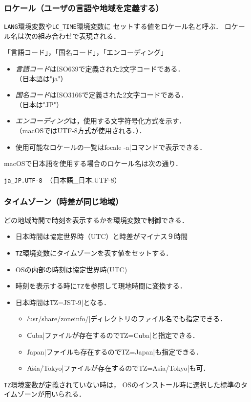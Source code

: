 \documentclass{beamer}                 %
\begin{document}
\begin{frame}[fragile]
  \frametitle{ロケール（ユーザの言語や地域を定義する）}
  \texttt{LANG}環境変数や\texttt{LC\_TIME}環境変数に
  セットする値をロケール名と呼ぶ．
  ロケール名は次の組み合わせで表現される．
  \centerline{「言語コード」，「国名コード」，「エンコーディング」}
\vfill
\begin{itemize}
\item \emph{言語コード}はISO639で定義された2文字コードである．\\
  （日本語は"ja"）
\item \emph{国名コード}はISO3166で定義された2文字コードである．\\
  （日本は"JP"）
\item \emph{エンコーディング}は，使用する文字符号化方式を示す．\\
  （macOSではUTF-8方式が使用される．）．
\item 使用可能なロケールの一覧は\|locale -a|コマンドで表示できる．
\end{itemize}
\vfill
macOSで日本語を使用する場合のロケール名は次の通り．
\centerline{\texttt{ja\_JP.UTF-8 }（日本語\_日本.UTF-8）}
\end{frame}

\begin{frame}[fragile]
  \frametitle{タイムゾーン（時差が同じ地域）}
  どの地域時間で時刻を表示するかを環境変数で制御できる．
  \vfill
  \begin{itemize}
  \item 日本時間は協定世界時（UTC）と時差がマイナス９時間
  \item \texttt{TZ}環境変数にタイムゾーンを表す値をセットする．
  \item OSの内部の時刻は協定世界時(UTC)
  \item 時刻を表示する時に\texttt{TZ}を参照して現地時間に変換する．
  \item 日本時間は\|TZ=JST-9|となる．
    \begin{itemize}
      \item \|/usr/share/zoneinfo/|ディレクトリのファイル名でも指定できる．
      \item \|Cuba|ファイルが存在するので\|TZ=Cuba|と指定できる．
      \item \|Japan|ファイルも存在するので\|TZ=Japan|も指定できる．
      \item \|Asia/Tokyo|ファイルが存在するので\|TZ=Asia/Tokyo|も可．
    \end{itemize}
  \end{itemize}
  \vfill
\texttt{TZ}環境変数が定義されていない時は，
OSのインストール時に選択した標準のタイムゾーンが用いられる．
\end{frame}
\end{document}
